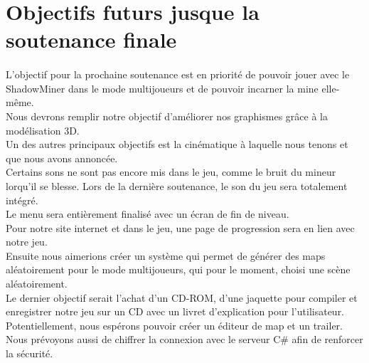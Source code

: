 \documentclass[titlepage, 13px, a4paper]{report}
\begin{document}
\newpage




\section{Objectifs futurs jusque la soutenance finale} 
\paragraph{} \hspace{0pt} 
L'objectif pour la prochaine soutenance est en priorité de pouvoir jouer avec le ShadowMiner dans le mode multijoueurs et 
de pouvoir incarner la mine elle-même. \\

Nous devrons remplir notre objectif d'améliorer nos graphismes grâce à la modélisation 3D. \\

Un des autres principaux objectifs est la cinématique à laquelle nous tenons et que nous avons annoncée. \\

Certains sons ne sont pas encore mis dans le jeu, comme le bruit du mineur lorqu’il se blesse.
Lors de la dernière soutenance, le son du jeu sera totalement intégré. \\

Le menu sera entièrement finalisé avec un écran de fin de niveau. \\

Pour notre site internet et dans le jeu, une page de progression sera en lien avec notre jeu. \\

Ensuite nous aimerions créer un système qui permet de générer des maps aléatoirement pour le mode multijoueurs, qui pour 
le moment, choisi une scène aléatoirement. \\

Le dernier objectif serait l'achat d'un CD-ROM, d'une jaquette pour compiler et enregistrer notre jeu sur un CD avec 
un livret d'explication pour l'utilisateur. \\

Potentiellement, nous espérons pouvoir créer un éditeur de map et un trailer. \\

Nous prévoyons aussi de chiffrer la connexion avec le serveur C\# afin de renforcer la sécurité.



\newpage
\end{document}
